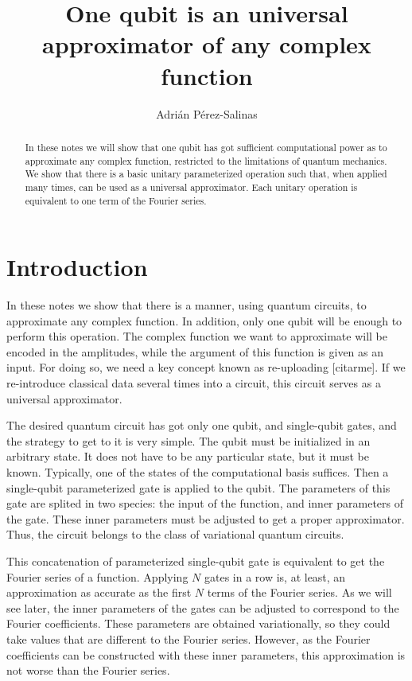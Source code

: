 \documentclass[aps,amssymb,amsmath,amsfonts,pra,superscriptaddress,onecolumn]{revtex4}
\begin{document}
\title{One qubit is an universal approximator of any complex function}
\author{Adrián Pérez-Salinas}

\begin{abstract}
    In these notes we will show that one qubit has got sufficient computational power as to approximate any complex function, restricted to the limitations of quantum mechanics. We show that there is a basic unitary parameterized operation such that, when applied many times, can be used as a universal approximator. Each unitary operation is equivalent to one term of the Fourier series. 
\end{abstract}
\maketitle

\section{Introduction}
In these notes we show that there is a manner, using quantum circuits, to approximate any complex function. In addition, only one qubit will be enough to perform this operation. The complex function we want to approximate will be encoded in the amplitudes, while the argument of this function is given as an input. For doing so, we need a key concept known as re-uploading [citarme]. If we re-introduce classical data several times into a circuit, this circuit serves as a universal approximator. 

The desired quantum circuit has got only one qubit, and single-qubit gates, and the strategy to get to it is very simple. The qubit must be initialized in an arbitrary state. It does not have to be any particular state, but it must be known. Typically, one of the states of the computational basis suffices. Then a single-qubit parameterized gate is applied to the qubit. The parameters of this gate are splited in two species: the input of the function, and inner parameters of the gate. These inner parameters must be adjusted to get a proper approximator. Thus, the circuit belongs to the class of variational quantum circuits.

This concatenation of parameterized single-qubit gate is equivalent to get the Fourier series of a function. Applying $N$ gates in a row is, at least, an approximation as accurate as the first $N$ terms of the Fourier series. As we will see later, the inner parameters of the gates can be adjusted to correspond to the Fourier coefficients. These parameters are obtained variationally, so they could take values that are different to the Fourier series. However, as the Fourier coefficients can be constructed with these inner parameters, this approximation is not worse than the Fourier series. 
\end{document}
